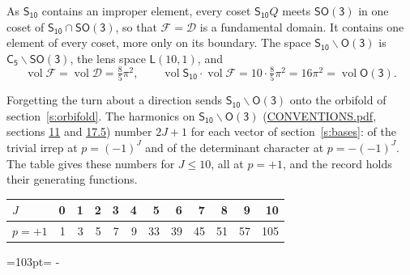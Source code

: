 \documentclass[10pt,a4paper]{article}
\newcommand{\needspace}[1]{\par\penalty-100\begingroup\dimen0=#1\relax\dimen2=\pagegoal
  \advance\dimen2-\pagetotal\ifdim\dimen0>\dimen2\relax\ifdim\dimen2>0pt\vfil\break\fi\fi
  \endgroup}
\numberwithin{equation}{section}
\newcommand{\grp}[1]{\mathsf{#1}}
\newcommand{\vol}{\operatorname{vol}}
\newcommand{\fcell}{\mathcal{D}}
\newcommand{\fdomain}{\mathcal{F}}
\newcommand{\lensspace}[2]{\mathsf{L}(#1, #2)}
\begin{document}
\leavevmode\label{n:set.fundamental}As $\grp{S_{10}}$ contains an improper element, every coset $\grp{S_{10}}Q$ meets \href{SO3.pdf}{$\grp{SO(3)}$} in one coset of $\grp{S_{10}} \cap \grp{SO(3)}$, so that $\fdomain = \fcell$ is a fundamental domain. It contains one element of every coset, more only on its boundary.
\leavevmode\label{n:set.lens}The space $\grp{S_{10}}\backslash\grp{O(3)}$ is $\grp{C_{5}}\backslash\grp{SO(3)}$, the lens space $\lensspace{10}{1}$, and
\begin{equation}\label{e:volume}\vol\fdomain = \vol\fcell = \tfrac{8}{5}\pi^2,\qquad \vol\grp{S_{10}}\cdot\vol\fdomain = 10\cdot \tfrac{8}{5}\pi^2 = 16\pi^2 = \vol\grp{O(3)}.\end{equation}

Forgetting the turn about a direction sends $\grp{S_{10}}\backslash\grp{O(3)}$ onto the orbifold of section~\ref{s:orbifold}.
The harmonics on $\grp{S_{10}}\backslash\grp{O(3)}$ (\href{../../CONVENTIONS.pdf}{CONVENTIONS.pdf}, sections \href{../../CONVENTIONS.pdf\#conv.11}{11} and \href{../../CONVENTIONS.pdf\#conv.17.5}{17.5}) number $2J + 1$ for each vector of section~\ref{s:bases}: of the trivial irrep at $p = (-1)^J$ and of the determinant character at $p = -(-1)^J$. The table gives these numbers for $J \le 10$, all at $p = +1$, and the record holds their generating functions.
{\small\setlength{\tabcolsep}{4pt}\begin{longtable}{@{}lrrrrrrrrrrr@{}}\toprule
$J$ & 0 & 1 & 2 & 3 & 4 & 5 & 6 & 7 & 8 & 9 & 10\\\midrule\endhead
\bottomrule\endfoot\endlastfoot
$p = +1$ & 1 & 3 & 5 & 7 & 9 & 33 & 39 & 45 & 51 & 57 & 105\\
\bottomrule\end{longtable}}
\needspace{103pt}
\end{document}

